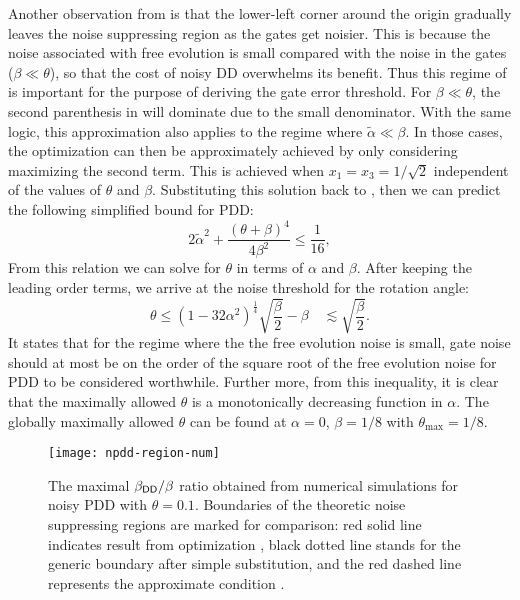 \documentclass[aps,pra,reprint,superscriptaddress]{revtex4-2}
\newcommand{\alphat}{\widetilde{\alpha}}
\begin{document}
Another observation from  is that the lower-left corner around the origin gradually leaves the noise suppressing region as the gates get noisier. This is because the noise associated with free evolution is small compared with the noise in the gates ($\beta\ll \theta$), so that the cost of noisy DD overwhelms its benefit. Thus this regime of is important for the purpose of deriving the gate error threshold.  
For $\beta\ll \theta$, the second parenthesis in  will dominate due to the small denominator. With the same logic, this approximation also applies to the regime where $\alphat \ll\beta$. In those cases, the optimization can then be approximately achieved by only considering maximizing the second term. This is achieved when 
$x_1=x_3=1/\sqrt{2}$ independent of the values of $\theta$ and $\beta$. Substituting this solution back to , then we can predict the following simplified bound for PDD:
\begin{equation}\label{eq:npdd-bound-simple}
2\alphat^2 + \frac{(\theta+\beta)^4}{4\beta^2}\le \frac{1}{16},
\end{equation}
From this relation we can solve for $\theta$ in terms of $\alpha$ and $\beta$. After keeping the leading order terms, we arrive at the noise threshold for the rotation angle:
\begin{equation}\label{eq:npdd-err-thres}
    \theta \le (1-32 \alpha ^2)^{\frac{1}{4}} \sqrt{\frac{\beta}{2} }-\beta
    \quad \lesssim \sqrt{\frac{\beta}{2}}.
\end{equation}
It states that for the regime where the the free evolution noise is small, gate noise should at most be on the order of the square root of the free evolution noise for PDD to be considered worthwhile. 
Further more, from this inequality, it is clear that the maximally allowed $\theta$ is a monotonically decreasing function in $\alpha$. The globally maximally allowed $\theta$ can be found at $\alpha=0$, $\beta=1/8$ with
$\theta_\mathrm{max}= 1/8$.


\begin{figure}[htbp]
    \centering
        \texttt{[image: npdd-region-num]}
        \caption{The maximal $\beta_{\mathsf{DD}}/\beta$ ratio obtained from numerical simulations for noisy PDD with $\theta=0.1$. Boundaries of the theoretic noise suppressing regions are marked for comparison: red solid line indicates result from optimization , black dotted line stands for the generic boundary after simple substitution, and the red dashed line represents the approximate condition .}
    \label{fig:npdd-reg-num}
    \end{figure}
\end{document}
